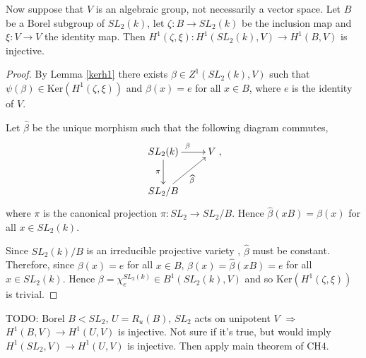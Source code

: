 \begin{example} Now suppose that $V$ is an algebraic group, not necessarily a vector space. Let $B$ be a Borel subgroup of $SL_2(k)$, let $\zeta: B \rightarrow SL_2(k)$ be the inclusion map and $\xi: V \rightarrow V$ the identity map. Then $H^1(\zeta, \xi): H^1(SL_2(k), V)\rightarrow H^1(B, V)$ is injective.
  \label{sl2_b_inj}
\end{example}
\begin{proof}
By Lemma \ref{kerh1} there exists $\beta \in Z^1(SL_2(k), V)$ such that $\psi(\beta) \in \mathrm{Ker}\left(H^1(\zeta, \xi)\right)$ and $\beta(x) = e$ for all $x \in B$, where $e$ is the identity of $V$.

Let $\widehat{\beta}$ be the unique morphism such that the following diagram commutes,
\begin{align*}
	\xymatrix{
	SL_2(k) \ar[r]^{\beta} \ar[d]_{\pi} & V\\
	SL_2/B \ar[ru]_{\widehat{\beta}}
	},
\end{align*}
where $\pi$ is the canonical projection $\pi:SL_2 \rightarrow SL_2/B$. Hence $\widehat{\beta}(xB) = \beta(x)$ for all $x \in SL_2(k)$.

Since $SL_2(k)/B$ is an irreducible projective variety \cite[Theorem 21.3]{humphreys1975linear}, $\widehat{\beta}$ must be constant. Therefore, since $\beta(x) = e$ for all $x \in B$, $\beta(x) = \widehat{\beta}(xB) = e$ for all $x \in SL_2(k)$. Hence $\beta = \chi^{SL_2(k)}_e \in B^1(SL_2(k), V)$ and so $\mathrm{Ker}\left(H^1(\zeta, \xi)\right)$ is trivial.
\end{proof} 

TODO: Borel $B < SL_2$, $U = R_u(B)$, $SL_2$ acts on unipotent $V$ $\Rightarrow$ $H^1(B, V) \rightarrow H^1(U, V)$ is injective. Not sure if it's true, but would imply $H^1(SL_2, V) \rightarrow H^1(U, V)$ is injective. Then apply main theorem of CH4.
